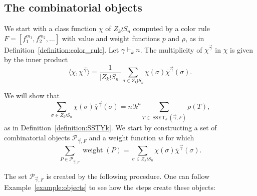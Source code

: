 \documentclass[a4paper,12pt]{amsart}
\theoremstyle{plain}
\theoremstyle{definition}
\theoremstyle{remark}
\DeclareMathOperator{\SSYT}{SSYT}
\DeclareMathOperator{\weight}{weight}
\begin{document}
\subsection{The combinatorial objects}
We start with a class function $\chi$ of $Z_k \wr S_n$ computed by a color rule $F=[f_1^{m_1},f_2^{m_2},\dots]$ with value and weight functions $p$ and $\rho$, as in Definition~\ref{definition:color_rule}. Let $\gamma \vdash_k n$. The multiplicity of $\chi^{\vec{\gamma}}$ in $\chi$ is given by the inner product
\[
\langle \chi, \chi^{\vec{\gamma}} \rangle = \frac{1}{|Z_k \wr S_n|} \sum_{\sigma \in Z_k \wr S_n} \chi(\sigma) \overline{\chi}^{\vec{\gamma}}(\sigma).
\]

We will show that 
\[
\sum_{\sigma \in Z_k \wr S_n} \chi(\sigma) \overline{\chi}^{\vec{\gamma}}(\sigma) = n! k^n \sum_{T \in \SSYT_k(\vec{\gamma}, F)} \rho(T),
\]
as in Definition~\ref{definition:SSTYk}. We start by constructing a set of combinatorial objects $\mathcal{P}_{\vec{\gamma},F}$ and a weight function $w$ for which
\[
\sum_{P \in \mathcal{P}_{\vec{\gamma},F}} \weight(P) = \sum_{\sigma \in Z_k \wr S_n} 
\chi(\sigma) \overline{\chi}^{\vec{\gamma}}(\sigma).
\]

The set $\mathcal{P}_{\vec{\gamma},F}$ is created by the following procedure. One can follow Example~\ref{example:objects} to see how the steps create these objects:
\end{document}
